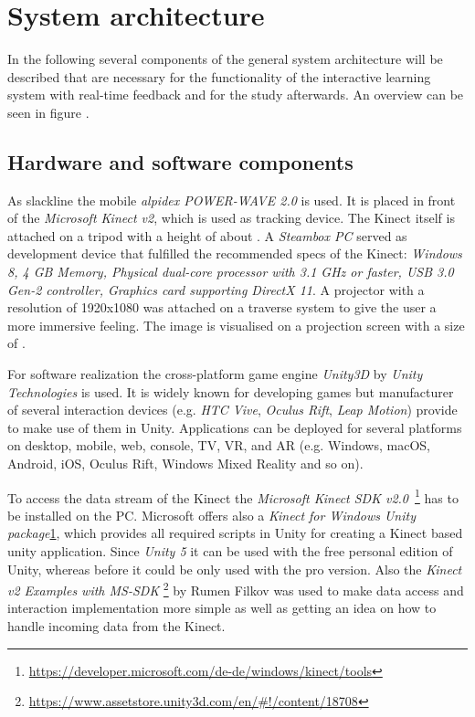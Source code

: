 \section{System architecture}\label{5_3_systemArchitecture}
In the following several components of the general system architecture will be described that are necessary for the functionality of the interactive learning system with real-time feedback and for the study afterwards. An overview can be seen in figure .

\subsection{Hardware and software components}

As slackline the mobile \textit{alpidex POWER-WAVE 2.0} is used. It is placed in front of the \textit{Microsoft Kinect v2}, which is used as tracking device. The Kinect itself is attached on a  tripod with a height of about . A \textit{Steambox PC}  served as development device that fulfilled the recommended specs of the Kinect: \textit{Windows 8, 4 GB Memory, Physical dual-core processor with 3.1 GHz or faster, USB 3.0 Gen-2 controller, Graphics card supporting DirectX 11}. A projector  with a resolution of 1920x1080 was attached on a traverse system to give the user a more immersive feeling. The image is visualised on a projection screen with a size of .

For software realization the cross-platform game engine \textit{Unity3D} by \textit{Unity Technologies} is used. It is widely known for developing games but manufacturer of several interaction devices (e.g. \textit{HTC Vive}, \textit{Oculus Rift}, \textit{Leap Motion}) provide  to make use of them in Unity. Applications can be deployed for several platforms on desktop, mobile, web, console, TV, VR, and AR (e.g. Windows, macOS, Android, iOS, Oculus Rift, Windows Mixed Reality and so on).

To access the data stream of the Kinect the \textit{Microsoft Kinect SDK v2.0}~\footnote{\label{fn:kinectTools}\url{https://developer.microsoft.com/de-de/windows/kinect/tools}} has to be installed on the PC. Microsoft offers also a \textit{Kinect for Windows Unity package}\cref{fn:kinectTools}, which provides all required scripts in Unity for creating a Kinect based unity application. Since \textit{Unity 5} it can be used with the free personal edition of Unity, whereas before it could be only used with the pro version. Also the \textit{Kinect v2 Examples with MS-SDK} \footnote{\url{https://www.assetstore.unity3d.com/en/\#!/content/18708}} by Rumen Filkov was used to make data access and interaction implementation more simple as well as getting an idea on how to handle incoming data from the Kinect.


